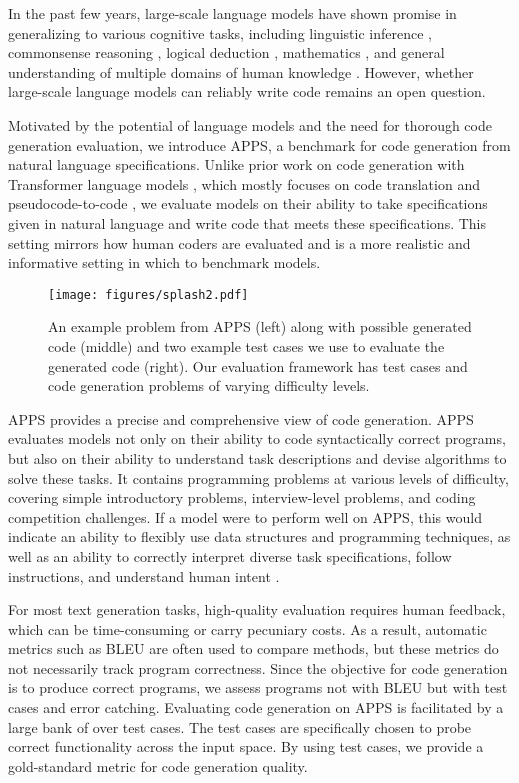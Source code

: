 \documentclass{article}
\begin{document}
In the past few years, large-scale language models have shown promise in generalizing to various cognitive tasks, including linguistic inference \citep{NEURIPS2019_4496bf24}, commonsense reasoning \citep{zellers2019hellaswag,huang2019cosmosqa,bisk2019physicaliqa}, logical deduction \citep{Liu2020LogiQAAC}, mathematics \citep{Polu2020GenerativeLM,hendrycksmath2021}, and general understanding of multiple domains of human knowledge \citep{hendryckstest2021}. However, whether large-scale language models can reliably write code remains an open question. 

Motivated by the potential of language models and the need for thorough code generation evaluation, we introduce APPS, a benchmark for code generation from natural language specifications. Unlike prior work on code generation with Transformer language models \citep{Vaswani2017AttentionIA}, which mostly focuses on code translation \citep{lachaux2020unsupervised} and pseudocode-to-code \citep{NEURIPS2019_7298332f}, we evaluate models on their ability to take specifications given in natural language and write code that meets these specifications. This setting mirrors how human coders are evaluated and is a more realistic and informative setting in which to benchmark models.

\begin{figure*}[t]
    \centering
    \texttt{[image: figures/splash2.pdf]}
    \caption{An example problem from APPS (left) along with possible generated code (middle) and two example test cases we use to evaluate the generated code (right). Our evaluation framework has test cases and  code generation problems of varying difficulty levels.}
    \label{fig:apps_splash}
\end{figure*}

APPS provides a precise and comprehensive view of code generation. APPS evaluates models not only on their ability to code syntactically correct programs, but also on their ability to understand task descriptions and devise algorithms to solve these tasks. It contains  programming problems at various levels of difficulty, covering simple introductory problems, interview-level problems, and coding competition challenges. If a model were to perform well on APPS, this would indicate an ability to flexibly use data structures and programming techniques, as well as an ability to correctly interpret diverse task specifications, follow instructions, and understand human intent \citep{hendrycks2021ethics}.

For most text generation tasks, high-quality evaluation requires human feedback, which can be time-consuming or carry pecuniary costs. As a result, automatic metrics such as BLEU \citep{papineni2002bleu} are often used to compare methods, but these metrics do not necessarily track program correctness. Since the objective for code generation is to produce correct programs, we assess programs not with BLEU but with test cases and error catching. Evaluating code generation on APPS is facilitated by a large bank of over  test cases. The test cases are specifically chosen to probe correct functionality across the input space. By using test cases, we provide a gold-standard metric for code generation quality.
\end{document}

